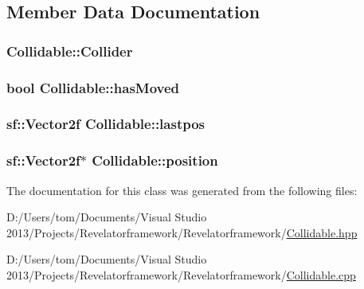 \subsection{Member Data Documentation}
\hypertarget{class_collidable_a0a81575218d87940935d70800f7d663e}{
\subsubsection[{Collider}]{ Collidable\-::\-Collider\hspace{0.3cm}{\ttfamily [protected]}}}\label{class_collidable_a0a81575218d87940935d70800f7d663e}
\hypertarget{class_collidable_afe5442fd3a82abe62b95e93248d5f4a1}{
\subsubsection[{has\-Moved}]{\setlength{\rightskip}{0pt plus 5cm}bool Collidable\-::has\-Moved\hspace{0.3cm}{\ttfamily [protected]}}}\label{class_collidable_afe5442fd3a82abe62b95e93248d5f4a1}
\hypertarget{class_collidable_ae50dbf8f9d1f584d3a5d5c3445fbe786}{
\subsubsection[{lastpos}]{\setlength{\rightskip}{0pt plus 5cm}sf\-::\-Vector2f Collidable\-::lastpos\hspace{0.3cm}{\ttfamily [protected]}}}\label{class_collidable_ae50dbf8f9d1f584d3a5d5c3445fbe786}
\hypertarget{class_collidable_aa6c2e113d920df8c0d5da2a244f924bd}{
\subsubsection[{position}]{\setlength{\rightskip}{0pt plus 5cm}sf\-::\-Vector2f$\ast$ Collidable\-::position\hspace{0.3cm}{\ttfamily [protected]}}}\label{class_collidable_aa6c2e113d920df8c0d5da2a244f924bd}


The documentation for this class was generated from the following files\-:\begin{DoxyCompactItemize}
\item 
D\-:/\-Users/tom/\-Documents/\-Visual Studio 2013/\-Projects/\-Revelatorframework/\-Revelatorframework/\hyperlink{_collidable_8hpp}{Collidable.\-hpp}\item 
D\-:/\-Users/tom/\-Documents/\-Visual Studio 2013/\-Projects/\-Revelatorframework/\-Revelatorframework/\hyperlink{_collidable_8cpp}{Collidable.\-cpp}\end{DoxyCompactItemize}
